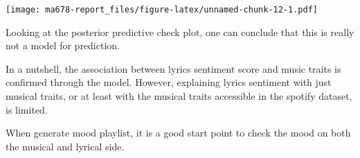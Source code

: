 \documentclass[]{article}
\begin{document}
\texttt{[image: ma678-report\_files/figure-latex/unnamed-chunk-12-1.pdf]}

Looking at the posterior predictive check plot, one can conclude that
this is really not a model for prediction.

In a nutshell, the association between lyrics sentiment score and music
traits is confirmed through the model. However, explaining lyrics
sentiment with just musical traits, or at least with the musical traits
accessible in the spotify dataset, is limited.

When generate mood playlist, it is a good start point to check the mood
on both the musical and lyrical side.
\end{document}
